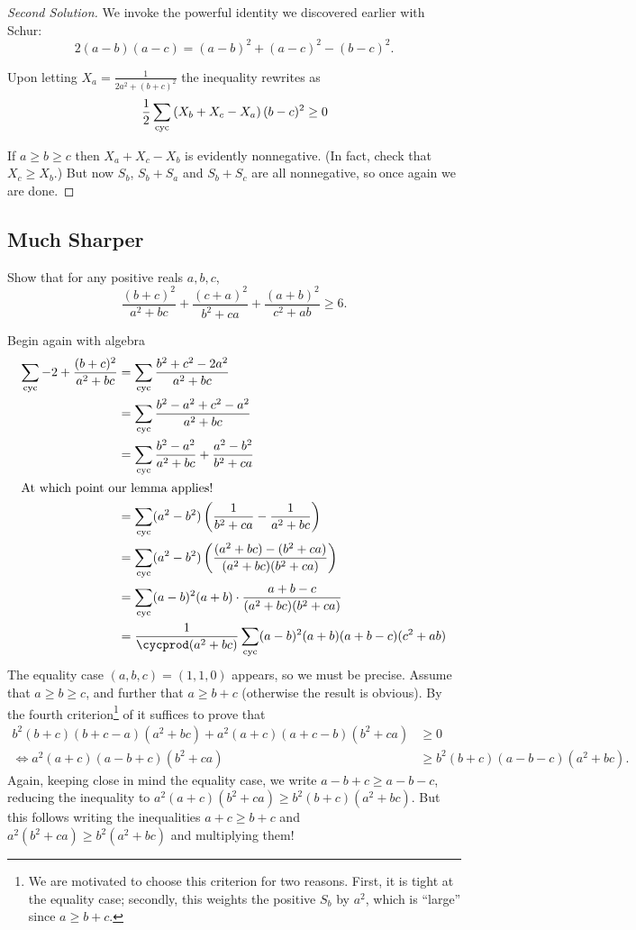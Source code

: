 \documentclass{scrartcl}
\begin{document}
\begin{proof}[Second Solution]
  We invoke the powerful identity we discovered earlier with Schur:
  \[ 2(a-b)(a-c) = (a-b)^2 + (a-c)^2 - (b-c)^2. \]

  Upon letting $X_a = \frac{1}{2a^2+(b+c)^2}$ the inequality rewrites as
  \[ \frac{1}{2} \sum_{\text{cyc}} \left( X_b+X_c-X_a \right)(b-c)^2 \ge 0 \]

  If $a \ge b \ge c$ then $X_a + X_c - X_b$ is evidently nonnegative.
  (In fact, check that $X_c \ge X_b$.)
  But now $S_b$, $S_b+S_a$ and $S_b+S_c$ are all nonnegative, so once again we are done.
\end{proof}

\subsection{Much Sharper}
\begin{example}
  Show that for any positive reals $a,b,c$,
  \[ \frac{(b+c)^2}{a^2+bc} + \frac{(c+a)^2}{b^2+ca} + \frac{(a+b)^2}{c^2+ab} \ge 6. \]
\end{example}
\begin{soln}
  Begin again with algebra
  \begin{align*}
    \cycsum -2 + \frac{(b+c)^2}{a^2+bc} &= \cycsum \frac{b^2+c^2-2a^2}{a^2+bc} \\
    &= \cycsum \frac{b^2-a^2 + c^2-a^2}{a^2+bc} \\
    &= \cycsum \frac{b^2-a^2}{a^2+bc} + \frac{a^2-b^2}{b^2+ca} \\
    \intertext{At which point our lemma applies!}
    &= \cycsum (a^2-b^2) \left( \frac{1}{b^2+ca} - \frac{1}{a^2+bc} \right) \\
    &= \cycsum (a^2-b^2) \left( \frac{(a^2+bc)-(b^2+ca)}{(a^2+bc)(b^2+ca)} \right) \\
    &= \cycsum (a-b)^2(a+b) \cdot \frac{a+b-c}{(a^2+bc)(b^2+ca)}  \\
    &= \frac{1}{\cycprod (a^2+bc)} \cycsum (a-b)^2(a+b)(a+b-c)(c^2+ab)
  \end{align*}
  The equality case $(a,b,c) = (1,1,0)$ appears, so we must be precise.
  Assume that $a \ge b \ge c$, and further that $a \ge b+c$ (otherwise the result is obvious).
  By the fourth criterion\footnote{We are motivated to choose this criterion for two reasons.
    First, it is tight at the equality case; secondly,
    this weights the positive $S_b$ by $a^2$, which is ``large'' since $a \ge b+c$.}
  of  it suffices to prove that
  \begin{align*}
    b^2(b+c)(b+c-a)(a^2+bc) + a^2(a+c)(a+c-b)(b^2+ca) &\ge 0 \\
    \iff a^2(a+c)(a-b+c)(b^2+ca) &\ge b^2(b+c)(a-b-c)(a^2+bc).
  \end{align*}
  Again, keeping close in mind the equality case, we write $a-b+c \ge a-b-c$,
  reducing the inequality to $a^2(a+c)(b^2+ca) \ge b^2(b+c)(a^2+bc)$.
  But this follows writing the inequalities $a+c \ge b+c$
  and $a^2(b^2+ca) \ge b^2(a^2+bc)$ and multiplying them!
\end{soln}
\end{document}
